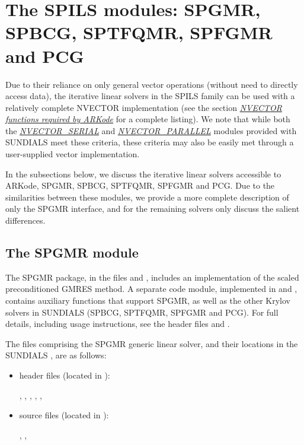 \documentclass[letterpaper,10pt,english]{sphinxmanual}
\begin{document}
\section{The SPILS modules: SPGMR, SPBCG, SPTFQMR, SPFGMR and PCG}
\label{linear_solvers/SPILS:the-spils-modules-spgmr-spbcg-sptfqmr-spfgmr-and-pcg}\label{linear_solvers/SPILS:linearsolvers-spils}\label{linear_solvers/SPILS::doc}
Due to their reliance on only general vector operations (without need
to directly access data), the iterative linear solvers in the SPILS
family can be used with a relatively complete NVECTOR implementation
(see the section {\hyperref[nvectors/ARKode_requirements:nvectors-arkode]{\emph{NVECTOR functions required by ARKode}}} for a complete listing).
We note that while both the {\hyperref[nvectors/NVector_Serial:nvectors-nvserial]{\emph{NVECTOR\_SERIAL}}}
and {\hyperref[nvectors/NVector_Parallel:nvectors-nvparallel]{\emph{NVECTOR\_PARALLEL}}} modules provided
with SUNDIALS meet these criteria, these criteria may also be easily met
through a user-supplied vector implementation.

In the subsections below, we discuss the iterative linear solvers
accessible to ARKode, SPGMR, SPBCG, SPTFQMR, SPFGMR and PCG.  Due to
the similarities between these modules, we provide a more complete
description of only the SPGMR interface, and for the remaining solvers
only discuss the salient differences.


\subsection{The SPGMR module}
\label{linear_solvers/SPILS:the-spgmr-module}
The SPGMR package, in the files  and
, includes an implementation of the scaled
preconditioned GMRES method.  A separate code module, implemented in
 and , contains
auxiliary functions that support SPGMR, as well as the other Krylov
solvers in SUNDIALS (SPBCG, SPTFQMR, SPFGMR and PCG).  For full
details, including usage instructions, see the header files
 and .

The files comprising the SPGMR generic linear solver, and their
locations in the SUNDIALS , are as follows:
\begin{itemize}
\item {} 
header files (located in ):

, ,
, , ,

\item {} 
source files (located in ):

, , 

\end{itemize}
\end{document}

